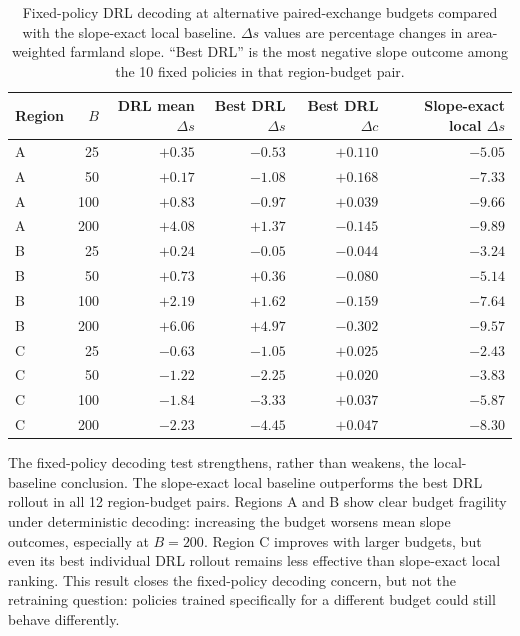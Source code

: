 \documentclass[]{interact}
\theoremstyle{plain}
\begin{document}
\begin{table}[htbp]
\centering
\caption{Fixed-policy DRL decoding at alternative paired-exchange budgets compared with the slope-exact local baseline. $\Delta s$ values are percentage changes in area-weighted farmland slope. ``Best DRL'' is the most negative slope outcome among the 10 fixed policies in that region-budget pair.}
\label{tab:drl-budget-decode}
\scriptsize
\begin{tabular}{lrrrrr}
\toprule
Region & $B$ & DRL mean $\Delta s$ & Best DRL $\Delta s$ & Best DRL $\Delta c$ & Slope-exact local $\Delta s$ \\
\midrule
A & 25  & $+0.35$ & $-0.53$ & $+0.110$ & $-5.05$ \\
A & 50  & $+0.17$ & $-1.08$ & $+0.168$ & $-7.33$ \\
A & 100 & $+0.83$ & $-0.97$ & $+0.039$ & $-9.66$ \\
A & 200 & $+4.08$ & $+1.37$ & $-0.145$ & $-9.89$ \\
\midrule
B & 25  & $+0.24$ & $-0.05$ & $-0.044$ & $-3.24$ \\
B & 50  & $+0.73$ & $+0.36$ & $-0.080$ & $-5.14$ \\
B & 100 & $+2.19$ & $+1.62$ & $-0.159$ & $-7.64$ \\
B & 200 & $+6.06$ & $+4.97$ & $-0.302$ & $-9.57$ \\
\midrule
C & 25  & $-0.63$ & $-1.05$ & $+0.025$ & $-2.43$ \\
C & 50  & $-1.22$ & $-2.25$ & $+0.020$ & $-3.83$ \\
C & 100 & $-1.84$ & $-3.33$ & $+0.037$ & $-5.87$ \\
C & 200 & $-2.23$ & $-4.45$ & $+0.047$ & $-8.30$ \\
\bottomrule
\end{tabular}
\end{table}

The fixed-policy decoding test strengthens, rather than weakens, the local-baseline conclusion. The slope-exact local baseline outperforms the best DRL rollout in all 12 region-budget pairs. Regions A and B show clear budget fragility under deterministic decoding: increasing the budget worsens mean slope outcomes, especially at $B=200$. Region C improves with larger budgets, but even its best individual DRL rollout remains less effective than slope-exact local ranking. This result closes the fixed-policy decoding concern, but not the retraining question: policies trained specifically for a different budget could still behave differently.
\end{document}
